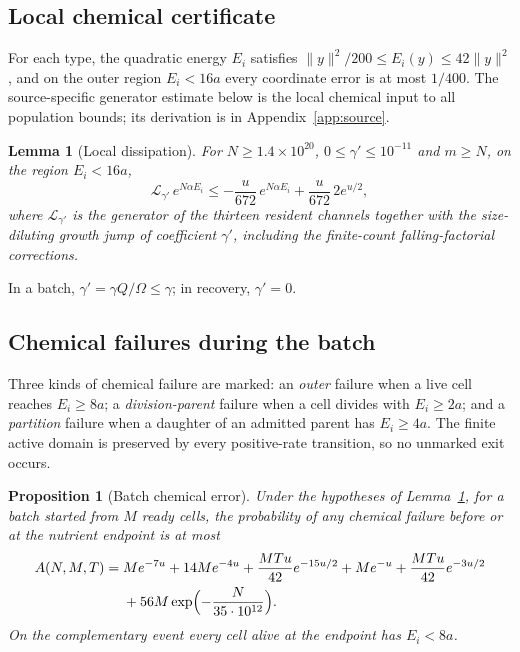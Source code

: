 \documentclass[11pt,a4paper]{article}
\theoremstyle{plain}
\newtheorem{proposition}[theorem]{Proposition}
\newtheorem{lemma}[theorem]{Lemma}
\theoremstyle{definition}
\theoremstyle{remark}
\newcommand{\gen}{\mathcal L}
\begin{document}
\subsection{Local chemical certificate}
For each type, the quadratic energy $E_i$ satisfies $\|y\|^2/200\le E_i(y)\le42\|y\|^2$, and on the outer region $E_i<16a$ every coordinate error is at most $1/400$. The source-specific generator estimate below is the local chemical input to all population bounds; its derivation is in Appendix~\ref{app:source}.

\begin{lemma}[Local dissipation]\label{lem:local}
For $N\ge1.4\times10^{20}$, $0\le\gamma'\le10^{-11}$ and $m\ge N$, on the region $E_i<16a$,
\begin{equation}\label{eq:local}
\gen_{\gamma'}\,e^{N\alpha E_i}\le-\frac u{672}\,e^{N\alpha E_i}+\frac u{672}\,2e^{u/2},
\end{equation}
where $\gen_{\gamma'}$ is the generator of the thirteen resident channels together with the size-diluting growth jump of coefficient $\gamma'$, including the finite-count falling-factorial corrections.
\end{lemma}

In a batch, $\gamma'=\gamma Q/\Omega\le\gamma$; in recovery, $\gamma'=0$.

\subsection{Chemical failures during the batch}
Three kinds of chemical failure are marked: an \emph{outer} failure when a live cell reaches $E_i\ge8a$; a \emph{division-parent} failure when a cell divides with $E_i\ge2a$; and a \emph{partition} failure when a daughter of an admitted parent has $E_i\ge4a$. The finite active domain is preserved by every positive-rate transition, so no unmarked exit occurs.

\begin{proposition}[Batch chemical error]\label{prop:chem}
Under the hypotheses of Lemma~\ref{lem:local}, for a batch started from $M$ ready cells, the probability of any chemical failure before or at the nutrient endpoint is at most
\begin{align}\label{eq:A}
A(N,M,T)={}&Me^{-7u}+14Me^{-4u}+\frac{MTu}{42}e^{-15u/2}+Me^{-u}+\frac{MTu}{42}e^{-3u/2}\nonumber\\
&+56M\exp\Bigl(-\frac N{35\cdot10^{12}}\Bigr).
\end{align}
On the complementary event every cell alive at the endpoint has $E_i<8a$.
\end{proposition}
\end{document}
